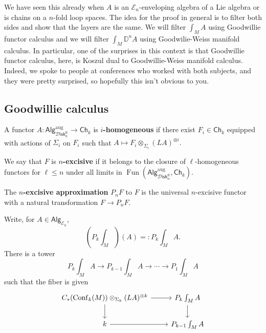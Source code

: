 \documentclass{amsart}
\DeclareMathOperator{\Fun}{Fun}
\DeclareMathOperator{\Conf}{Conf}
\newcommand{\Diskf}{\mathscr{D}\mathsf{isk}_n^\text{fr}}
\newcommand{\aug}{\mathrm{aug}}
\begin{document}
We have seen this already when $A$ is an $\mathcal{E}_n$-enveloping algebra of a Lie algebra or is chains
on a $n$-fold loop spaces. The idea for the proof in general is to filter both sides and show that the
layers are the same. We will filter $\int_MA$ using Goodwillie functor calculus and we will filter
$\int_M\mathbb{D}^n A$ using Goodwilie-Weiss manifold calculus. In particular, one of the surprises
in this context is that Goodwillie functor calculus, here, is Koszul dual to Goodwillie-Weiss manifold
calculus. Indeed, we spoke to people at conferences who worked with both subjects, and they were pretty
surprised, so hopefully this isn't obvious to you.

\subsection{Goodwillie calculus}

\begin{definition}
    A functor $A:\mathsf{Alg}^\aug_{\Diskf}\to \mathsf{Ch}_k$ is \textbf{$i$-homogeneous} if there exist $F_i\in\mathsf{Ch}_k$
    equipped with actions of $\Sigma_i$ on $F_i$ such that $A\mapsto F_i\otimes_{\Sigma_i}(LA)^{\otimes i}.$
\end{definition}

\begin{definition}
    We say that $F$ is \textbf{$n$-excisive} if it belongs to the closure of $\ell$-homogeneous
    functors for $\ell\leq n$ under all limits in $\Fun(\mathsf{Alg}^\aug_{\Diskf},\mathsf{Ch}_k).$
\end{definition}

\begin{definition}
    The \textbf{$n$-excisive approximation} $P_nF$ to $F$ is the universal $n$-excisive functor with
    a natural transformation $F\to P_nF$.
\end{definition}

\begin{lemma}
    Write, for $A\in\mathsf{Alg}_{\mathcal{E}_n}$,
    \begin{equation*}
        \left( P_k\int_M \right)(A) =: P_k\int_M A.
    \end{equation*}
    There is a tower
    \begin{equation*}
        P_k\int_MA\to P_{k-1}\int_MA\to\cdots\to P_1\int_M A
    \end{equation*}
    such that the fiber is given
    \begin{equation*}
        \begin{tikzcd}
            C_*(\Conf_k(M))\otimes_{\Sigma_k}(LA)^{\otimes k}\rar\dar & P_k\int_MA\dar \\
            k\rar & P_{k-1}\int_MA
        \end{tikzcd}
    \end{equation*}
\end{lemma}
\end{document}
